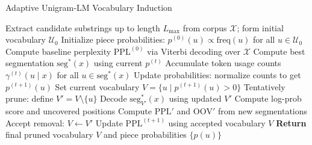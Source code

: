 \begin{algorithm}[H]
	\caption{Adaptive Unigram‐LM Vocabulary Induction}
	\label{alg:vocab-induction}
	\begin{algorithmic}[1]
		\STATE Extract candidate substrings up to length \(L_{\max}\) from corpus \(\mathcal{X}\); form initial vocabulary \(\mathcal{U}_0\)
		\STATE Initialize piece probabilities: \(p^{(0)}(u) \propto \mathrm{freq}(u)\) for all \(u \in \mathcal{U}_0\)
		\STATE Compute baseline perplexity \(\mathrm{PPL}^{(0)}\) via Viterbi decoding over \(\mathcal{X}\)
		\STATE Compute best segmentation \(\mathrm{seg}^{*}(x)\) using current \(p^{(t)}\)
		\STATE Accumulate token usage counts \(\gamma^{(t)}(u \mid x)\) for all \(u \in \mathrm{seg}^{*}(x)\)
		\ENDFOR
		\STATE Update probabilities: normalize counts to get \(p^{(t+1)}(u)\)
		\STATE Set current vocabulary \(V = \{u \mid p^{(t+1)}(u) > 0\}\)
		\STATE Tentatively prune: define \(V' = V \setminus \{u\}\)
		\STATE Decode \(\mathrm{seg}^{*}_{V'}(x)\) using updated \(V'\)
		\STATE Compute log-prob score and uncovered positions
		\ENDFOR
		\STATE Compute \(\mathrm{PPL}'\) and \(\mathrm{OOV}'\) from new segmentations
		\STATE Accept removal: \(V \leftarrow V'\)
		\ENDIF
		\ENDFOR
		\STATE Update \(\mathrm{PPL}^{(t+1)}\) using accepted vocabulary \(V\)
		\ENDFOR
		\STATE \textbf{Return} final pruned vocabulary \(V\) and piece probabilities \(\{p(u)\}\)
	\end{algorithmic}
\end{algorithm}